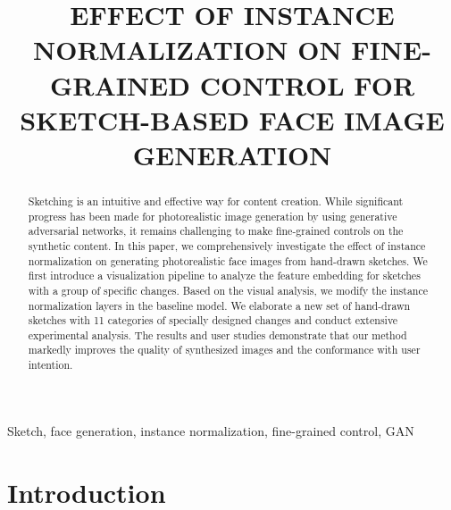 \documentclass{article}
\title{EFFECT OF INSTANCE NORMALIZATION ON FINE-GRAINED CONTROL FOR SKETCH-BASED FACE IMAGE GENERATION}
\begin{document}
%
\maketitle
%
\begin{abstract}
Sketching is an intuitive and effective way for content creation. While significant progress has been made for photorealistic image generation by using generative adversarial networks, it remains challenging to make fine-grained controls on the synthetic content. 
In this paper, we comprehensively investigate the effect of instance normalization on generating photorealistic face images from hand-drawn sketches.
We first introduce a visualization pipeline to analyze the feature embedding for sketches with a group of specific changes.  
Based on the visual analysis, we modify the instance normalization layers in the baseline model. 
We elaborate a new set of hand-drawn sketches with 11 categories of specially designed changes and conduct extensive experimental analysis.  The results and user studies demonstrate that our method markedly improves the quality of synthesized images and the conformance with user intention.

\end{abstract}
%
\begin{keywords}
Sketch, face generation, instance normalization, fine-grained control, GAN
\end{keywords}
%
\section{Introduction}
\label{sec:intro}
\end{document}
